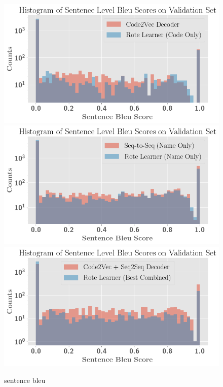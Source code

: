 \begin{figure}
\begin{center}
\includegraphics[width=0.75\linewidth]{ImagesCodeRelated/pretty_sentence_c2v.png}
\includegraphics[width=.75\linewidth]{ImagesCodeRelated/pretty_sentence_bleu_s2s.png}
\includegraphics[width=.75\linewidth]{ImagesCodeRelated/pretty_sentence_bleu_c2e.png}
\end{center}
\caption{sentence bleu}
\label{fig:sentence_bleu}

\end{figure}

